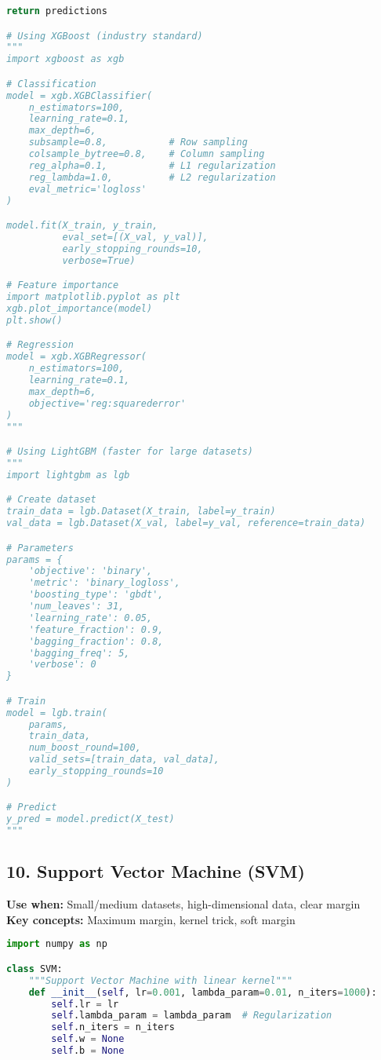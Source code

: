 \documentclass[8pt,landscape]{article}
\begin{document}
\begin{multicols}{3}
\begin{lstlisting}[language=Python]
        return predictions

# Using XGBoost (industry standard)
"""
import xgboost as xgb

# Classification
model = xgb.XGBClassifier(
    n_estimators=100,
    learning_rate=0.1,
    max_depth=6,
    subsample=0.8,           # Row sampling
    colsample_bytree=0.8,    # Column sampling
    reg_alpha=0.1,           # L1 regularization
    reg_lambda=1.0,          # L2 regularization
    eval_metric='logloss'
)

model.fit(X_train, y_train,
          eval_set=[(X_val, y_val)],
          early_stopping_rounds=10,
          verbose=True)

# Feature importance
import matplotlib.pyplot as plt
xgb.plot_importance(model)
plt.show()

# Regression
model = xgb.XGBRegressor(
    n_estimators=100,
    learning_rate=0.1,
    max_depth=6,
    objective='reg:squarederror'
)
"""

# Using LightGBM (faster for large datasets)
"""
import lightgbm as lgb

# Create dataset
train_data = lgb.Dataset(X_train, label=y_train)
val_data = lgb.Dataset(X_val, label=y_val, reference=train_data)

# Parameters
params = {
    'objective': 'binary',
    'metric': 'binary_logloss',
    'boosting_type': 'gbdt',
    'num_leaves': 31,
    'learning_rate': 0.05,
    'feature_fraction': 0.9,
    'bagging_fraction': 0.8,
    'bagging_freq': 5,
    'verbose': 0
}

# Train
model = lgb.train(
    params,
    train_data,
    num_boost_round=100,
    valid_sets=[train_data, val_data],
    early_stopping_rounds=10
)

# Predict
y_pred = model.predict(X_test)
"""
\end{lstlisting}

\subsection*{10. Support Vector Machine (SVM)}
\textbf{Use when:} Small/medium datasets, high-dimensional data, clear margin \\
\textbf{Key concepts:} Maximum margin, kernel trick, soft margin
\begin{lstlisting}[language=Python]
import numpy as np

class SVM:
    """Support Vector Machine with linear kernel"""
    def __init__(self, lr=0.001, lambda_param=0.01, n_iters=1000):
        self.lr = lr
        self.lambda_param = lambda_param  # Regularization
        self.n_iters = n_iters
        self.w = None
        self.b = None


\end{lstlisting}
\end{multicols}
\end{document}
